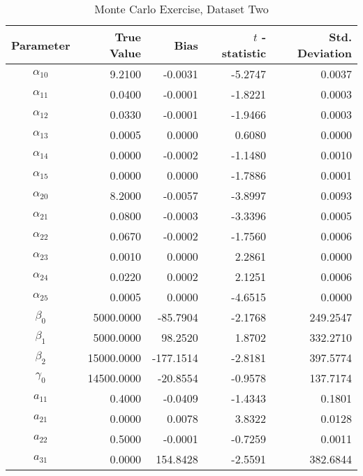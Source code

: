 \begin{table}\onehalfspacing
\begin{center}
\begin{threeparttable}
  \caption{Monte Carlo Exercise, Dataset Two}
  \label{Monte Carlo: Two}
  \begin{tabular}{crrrr}\toprule

  Parameter & True Value & Bias & $t$ - statistic & Std. Deviation \\
  \midrule
  $\alpha_{10}$ &      \phantom{20000}9.2100 &  -0.0031 & -5.2747 &   0.0037 \\
  $\alpha_{11}$ &      0.0400 &  -0.0001 & -1.8221 &   0.0003 \\
  $\alpha_{12}$ &      0.0330 &  -0.0001 & -1.9466 &   0.0003 \\
  $\alpha_{13}$ &      0.0005 &   0.0000 &  0.6080 &   0.0000 \\
  $\alpha_{14}$ &      0.0000 &  -0.0002 & -1.1480 &   0.0010 \\
  $\alpha_{15}$ &      0.0000 &   0.0000 & -1.7886 &   0.0001 \\
  $\alpha_{20}$ &      8.2000 &  -0.0057 & -3.8997 &   0.0093 \\
  $\alpha_{21}$ &      0.0800 &  -0.0003 & -3.3396 &   0.0005 \\
  $\alpha_{22}$ &      0.0670 &  -0.0002 & -1.7560 &   0.0006 \\
  $\alpha_{23}$ &      0.0010 &   0.0000 &  2.2861 &   0.0000 \\
  $\alpha_{24}$ &      0.0220 &   0.0002 &  2.1251 &   0.0006 \\
  $\alpha_{25}$ &      0.0005 &   0.0000 & -4.6515 &   0.0000 \\
  $\beta_{0}$   &   5000.0000 & -85.7904 & -2.1768 & 249.2547 \\
  $\beta_{1}$   &   5000.0000 &  98.2520 &  1.8702 & 332.2710 \\
  $\beta_{2}$   &  15000.0000 &-177.1514 & -2.8181 & 397.5774 \\
  $\gamma_{0}$  &  14500.0000 & -20.8554 & -0.9578 & 137.7174 \\
  $a_{11}$      &      0.4000 &  -0.0409 & -1.4343 &   0.1801 \\
  $a_{21}$      &      0.0000 &   0.0078 &  3.8322 &   0.0128 \\
  $a_{22}$      &      0.5000 &  -0.0001 & -0.7259 &   0.0011 \\
  $a_{31}$      &      0.0000 & 154.8428 & -2.5591 & 382.6844 \\

\end{tabular}
\end{threeparttable}
\end{center}
\end{table}
